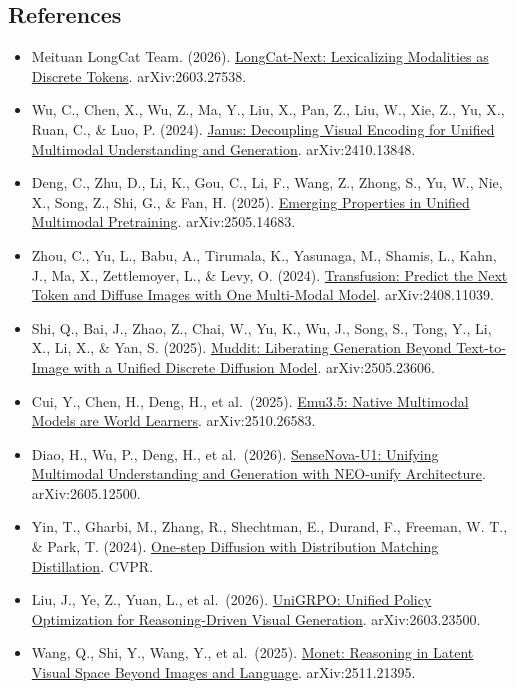 \FloatBarrier
{}
\hypertarget{references-147}{%
\subsection{References}\label{references-147}}

\vspace{0.25em}
\begin{itemize}
\tightlist
\item
  Meituan LongCat Team. (2026). \href{https://arxiv.org/abs/2603.27538}{LongCat-Next: Lexicalizing Modalities as Discrete Tokens}. arXiv:2603.27538.
\item
  Wu, C., Chen, X., Wu, Z., Ma, Y., Liu, X., Pan, Z., Liu, W., Xie, Z., Yu, X., Ruan, C., \& Luo, P. (2024). \href{https://arxiv.org/abs/2410.13848}{Janus: Decoupling Visual Encoding for Unified Multimodal Understanding and Generation}. arXiv:2410.13848.
\item
  Deng, C., Zhu, D., Li, K., Gou, C., Li, F., Wang, Z., Zhong, S., Yu, W., Nie, X., Song, Z., Shi, G., \& Fan, H. (2025). \href{https://arxiv.org/abs/2505.14683}{Emerging Properties in Unified Multimodal Pretraining}. arXiv:2505.14683.
\item
  Zhou, C., Yu, L., Babu, A., Tirumala, K., Yasunaga, M., Shamis, L., Kahn, J., Ma, X., Zettlemoyer, L., \& Levy, O. (2024). \href{https://arxiv.org/abs/2408.11039}{Transfusion: Predict the Next Token and Diffuse Images with One Multi-Modal Model}. arXiv:2408.11039.
\item
  Shi, Q., Bai, J., Zhao, Z., Chai, W., Yu, K., Wu, J., Song, S., Tong, Y., Li, X., Li, X., \& Yan, S. (2025). \href{https://arxiv.org/abs/2505.23606}{Muddit: Liberating Generation Beyond Text-to-Image with a Unified Discrete Diffusion Model}. arXiv:2505.23606.
\item
  Cui, Y., Chen, H., Deng, H., et al.~(2025). \href{https://arxiv.org/abs/2510.26583}{Emu3.5: Native Multimodal Models are World Learners}. arXiv:2510.26583.
\item
  Diao, H., Wu, P., Deng, H., et al.~(2026). \href{https://arxiv.org/abs/2605.12500}{SenseNova-U1: Unifying Multimodal Understanding and Generation with NEO-unify Architecture}. arXiv:2605.12500.
\item
  Yin, T., Gharbi, M., Zhang, R., Shechtman, E., Durand, F., Freeman, W. T., \& Park, T. (2024). \href{https://arxiv.org/abs/2311.18828}{One-step Diffusion with Distribution Matching Distillation}. CVPR.
\item
  Liu, J., Ye, Z., Yuan, L., et al.~(2026). \href{https://arxiv.org/abs/2603.23500}{UniGRPO: Unified Policy Optimization for Reasoning-Driven Visual Generation}. arXiv:2603.23500.
\item
  Wang, Q., Shi, Y., Wang, Y., et al.~(2025). \href{https://arxiv.org/abs/2511.21395}{Monet: Reasoning in Latent Visual Space Beyond Images and Language}. arXiv:2511.21395.
\end{itemize}

\clearpage
